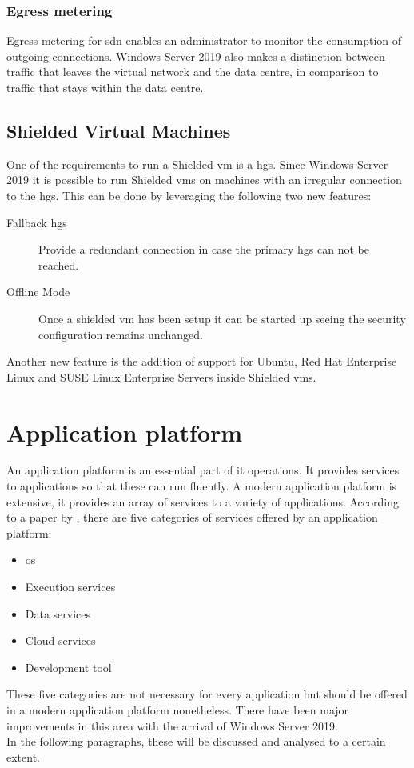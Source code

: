 \subsubsection{Egress metering}
Egress metering for \acrshort{sdn} enables an administrator to monitor the consumption of outgoing connections. Windows Server 2019 also makes a distinction between traffic that leaves the virtual network and the data centre, in comparison to traffic that stays within the data centre. 

\subsection{Shielded Virtual Machines}
One of the requirements to run a Shielded \acrshort{vm} is a \acrfull{hgs}. Since Windows Server 2019 it is possible to run Shielded \acrshort{vm}s on machines with an irregular connection to the \acrshort{hgs}. This can be done by leveraging the following two new features:

\begin{description}
	\item[Fallback \acrshort{hgs}] Provide a redundant connection in case the primary \acrshort{hgs} can not be reached.
	\item[Offline Mode] Once a shielded \acrshort{vm} has been setup it can be started up seeing the security configuration remains unchanged.
\end{description}

Another new feature is the addition of support for Ubuntu, Red Hat Enterprise Linux and SUSE Linux Enterprise Servers inside Shielded \acrshort{vm}s. 

\clearpage

\section{Application platform}
An application platform is an essential part of \acrshort{it} operations. It provides services to applications so that these can run fluently. A modern application platform is extensive, it provides an array of services to a variety of applications. According to a paper by \textcite{Chappell2011}, there are five categories of services offered by an application platform:
\begin{itemize}
	\item \acrshort{os}
	\item Execution services
	\item Data services
	\item Cloud services
	\item Development tool
\end{itemize}
These five categories are not necessary for every application but should be offered in a modern application platform nonetheless.
There have been major improvements in this area with the arrival of Windows Server 2019.\autocite{Gerend2018} 
\\
In the following paragraphs, these will be discussed and analysed to a certain extent.

